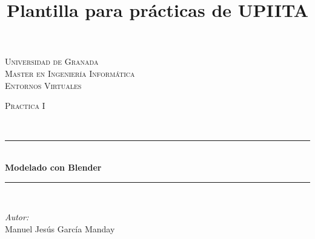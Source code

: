 \documentclass[10pt]{article}
\title{Plantilla para prácticas de UPIITA}
\begin{document}
\begin{center}																		%
\newcommand{\HRule}{\rule{\linewidth}{0.5mm}}									%
\begin{minipage}{0.48\textwidth} \begin{flushleft}
\end{flushleft}\end{minipage}
\begin{minipage}{0.48\textwidth} \begin{flushright}
\end{flushright}\end{minipage}

\vspace*{0.25cm}								%
\textsc{\huge Universidad de Granada}\\[1.5cm]	

\textsc{\LARGE Master en Ingeniería Informática}\\[1.5cm]													%

\textsc{\LARGE Entornos Virtuales}\\[1.5cm]													%

\begin{minipage}{0.9\textwidth} 
\begin{center}																					%
\textsc{\LARGE Practica I}
\end{center}
\end{minipage}\\[0.5cm]
 			\vspace*{1cm}																		%
\HRule \\[0.4cm]																	%
{ \huge \bfseries Modelado con Blender}\\[0.4cm]	%
\HRule \\[1.5cm]																	%
\begin{minipage}{0.46\textwidth}													%
\begin{flushleft} \large															%
\emph{Autor:}\\	
 Manuel Jesús García Manday
\end{flushleft}																		%
\end{minipage}		
\begin{minipage}{0.52\textwidth}		
\vspace{-0.6cm}											%
\begin{flushright} \large															%
\end{flushright}																	%
\end{minipage}	
\vspace*{1cm}
 	

\end{center}
\end{document}
